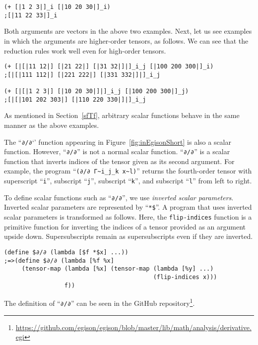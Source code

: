 \documentclass[acmlarge]{acmart}
\begin{document}
{\footnotesize
\begin{verbatim}
(+ [|1 2 3|]_i [|10 20 30|]_i)
;[|11 22 33|]_i
\end{verbatim}
}

Both arguments are vectors in the above two examples.
Next, let us see examples in which the arguments are higher-order tensors, as follows.
We can see that the reduction rules work well even for high-order tensors.

{\footnotesize
\begin{verbatim}
(+ [|[|11 12|] [|21 22|] [|31 32|]|]_i_j [|100 200 300|]_i)
;[|[|111 112|] [|221 222|] [|331 332|]|]_i_j

(+ [|[|1 2 3|] [|10 20 30|]|]_i_j [|100 200 300|]_j)
;[|[|101 202 303|] [|110 220 330|]|]_i_j
\end{verbatim}
}

As mentioned in Section~\ref{sfTf}, arbitrary scalar functions behave in the same manner as the above examples.

The ``\texttt{∂/∂}`' function appearing in Figure~\ref{fig:inEgisonShort} is also a scalar function.
However, ``\texttt{∂/∂}'' is not a normal scalar function.
``\texttt{∂/∂}''  is a scalar function that inverts indices of the tensor given as its second argument.
For example, the program ``\verb|(∂/∂ Γ~i_j_k x~l)|'' returns the fourth-order tensor with superscript ``\texttt{i}'', subscript ``\texttt{j}'', subscript ``\texttt{k}'', and subscript ``\texttt{l}'' from left to right.

To define scalar functions such as ``\texttt{∂/∂}'', we use \textit{inverted scalar parameters}.
Inverted scalar parameters are represented by ``\texttt{*\$}''.
A program that uses inverted scalar parameters is transformed as follows.
Here, the \texttt{flip-indices} function is a primitive function for inverting the indices of a tensor provided as an argument upside down.
Supersubscripts remain as supersubscripts even if they are inverted.

{\footnotesize
\begin{verbatim}
(define $∂/∂ (lambda [$f *$x] ...))
;=>(define $∂/∂ (lambda [%f %x]
     (tensor-map (lambda [%x] (tensor-map (lambda [%y] ...)
                                          (flip-indices x)))
                 f))
\end{verbatim}
}
    
The definition of ``\texttt{∂/∂}'' can be seen in the GitHub repository\footnote{\url{https://github.com/egison/egison/blob/master/lib/math/analysis/derivative.egi}}.
\end{document}
